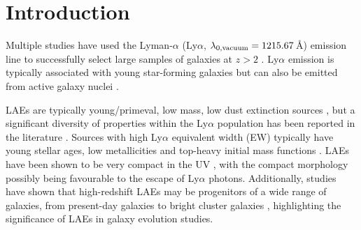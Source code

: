 \documentclass[a4paper,fleqn,usenatbib]{mnras}
\begin{document}
\section{Introduction} \label{sec:introduction}

Multiple studies have used the Lyman-$\alpha$ (Ly$\alpha$, $\lambda_{\rm 0,vacuum}=1215.67$\,\AA) emission line to successfully select large samples of galaxies at $z>2$ \citep[e.g.][]{Cowie1998,Malhotra2004,vanBreukelen2005,Ouchi2008,Rauch2008, Matthee2015, Santos2016,Drake2017, Sobral2018,Konno2018,Taylor2020}. Ly$\alpha$ emission is typically associated with young star-forming galaxies \citep[SFGs, e.g.][]{PartridgePeebles1967} but can also be emitted from active galaxy nuclei \citep[AGN; e.g.][]{Miley2008,Sobral2018Spectra,Calhau2020}.

LAEs are typically young/primeval, low mass, low dust extinction sources \citep[e.g.][]{Gawiser2006,Gawiser2007,Pentericci2007,Lai2008,Matthee2021}, but a significant diversity of properties within the Ly$\alpha$ population has been reported in the literature \citep[e.g.][]{Lai2008,Finkelstein2009,Acquaviva2012,Hagen2016,Matthee2016,Oyarzun2017,Santos2020}. Sources with high Ly$\alpha$ equivalent width (EW) typically have young stellar ages, low metallicities and top-heavy initial mass functions \citep[e.g.][]{Schaerer2003,Raiter2010,Hashimoto2017}. LAEs have been shown to be very compact in the UV \citep[e.g.][]{Malhotra2012,PaulinoAfonso2018}, with the compact morphology possibly being favourable to the escape of Ly$\alpha$ photons. Additionally, studies have shown that high-redshift LAEs may be progenitors of a wide range of galaxies, from present-day galaxies \citep[e.g.][]{Gawiser2007,Guaita2010,Yajima2012} to bright cluster galaxies \citep[BCGs; e.g.][]{Khostovan2019}, highlighting the significance of LAEs in galaxy evolution studies.
\end{document}

